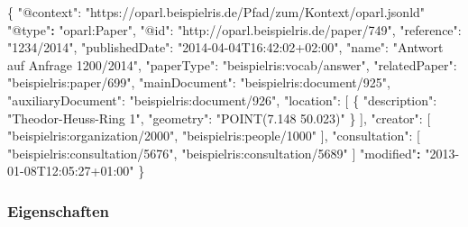 \documentclass[,a4paper]{article}
\newenvironment{Shaded}{}{}
\newcommand{\DataTypeTok}[1]{\textcolor[rgb]{0.56,0.13,0.00}{{#1}}}
\newcommand{\StringTok}[1]{\textcolor[rgb]{0.25,0.44,0.63}{{#1}}}
\newcommand{\ErrorTok}[1]{\textcolor[rgb]{1.00,0.00,0.00}{\textbf{{#1}}}}
\newcommand{\NormalTok}[1]{{#1}}
\begin{document}
\begin{Shaded}
\begin{Highlighting}[]
\NormalTok{\{}
    \DataTypeTok{"@context"}\NormalTok{: }\StringTok{"https://oparl.beispielris.de/Pfad/zum/Kontext/oparl.jsonld"}
    \StringTok{"@type"}\ErrorTok{:} \StringTok{"oparl:Paper"}\NormalTok{,}
    \DataTypeTok{"@id"}\NormalTok{: }\StringTok{"http://oparl.beispielris.de/paper/749"}\NormalTok{,}
    \DataTypeTok{"reference"}\NormalTok{: }\StringTok{"1234/2014"}\NormalTok{,}
    \DataTypeTok{"publishedDate"}\NormalTok{: }\StringTok{"2014-04-04T16:42:02+02:00"}\NormalTok{,}
    \DataTypeTok{"name"}\NormalTok{: }\StringTok{"Antwort auf Anfrage 1200/2014"}\NormalTok{,}
    \DataTypeTok{"paperType"}\NormalTok{: }\StringTok{"beispielris:vocab/answer"}\NormalTok{,}
    \DataTypeTok{"relatedPaper"}\NormalTok{: }\StringTok{"beispielris:paper/699"}\NormalTok{,}
    \DataTypeTok{"mainDocument"}\NormalTok{: }\StringTok{"beispielris:document/925"}\NormalTok{,}
    \DataTypeTok{"auxiliaryDocument"}\NormalTok{: }\StringTok{"beispielris:document/926"}\NormalTok{,}
    \DataTypeTok{"location"}\NormalTok{: [}
        \NormalTok{\{}
            \DataTypeTok{"description"}\NormalTok{: }\StringTok{"Theodor-Heuss-Ring 1"}\NormalTok{,}
            \DataTypeTok{"geometry"}\NormalTok{: }\StringTok{"POINT(7.148  50.023)"}
        \NormalTok{\}}
    \NormalTok{],}
    \DataTypeTok{"creator"}\NormalTok{: [}
        \StringTok{"beispielris:organization/2000"}\NormalTok{,}
        \StringTok{"beispielris:people/1000"}
    \NormalTok{],}
    \DataTypeTok{"consultation"}\NormalTok{: [}
        \StringTok{"beispielris:consultation/5676"}\NormalTok{,}
        \StringTok{"beispielris:consultation/5689"}
    \NormalTok{]}
    \StringTok{"modified"}\ErrorTok{:} \StringTok{"2013-01-08T12:05:27+01:00"}
\NormalTok{\}}
\end{Highlighting}
\end{Shaded}

\subsubsection{Eigenschaften}\label{eigenschaften-6}
\end{document}
